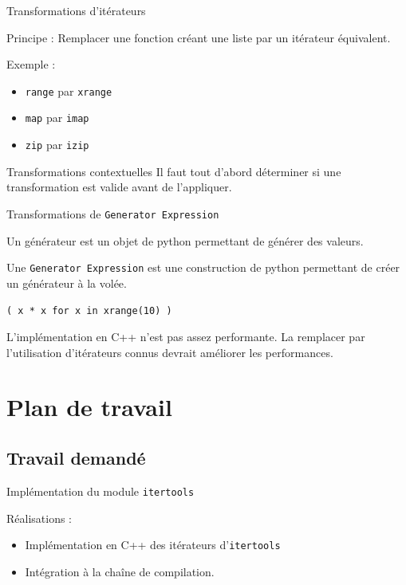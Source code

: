 \documentclass{beamer}
\begin{document}
\begin{frame}{Transformations d'itérateurs}

  Principe : Remplacer une fonction créant une liste par un itérateur
  équivalent.

  \pause Exemple :
  \begin{itemize}
  \item \texttt{range} par \texttt{xrange}
  \item \texttt{map} par \texttt{imap}
  \item \texttt{zip} par \texttt{izip}
  \end{itemize}

  \pause \begin{alertblock}{Transformations contextuelles} Il faut
    tout d'abord déterminer si une transformation est valide avant de
    l'appliquer.
  \end{alertblock}

\end{frame}

\begin{frame}{Transformations de \texttt{Generator Expression}}

  Un générateur est un objet de python permettant de générer des
  valeurs.

  Une \texttt{Generator Expression} est une construction de python
  permettant de créer un générateur à la volée.

  \pause\lstinline|( x * x for x in xrange(10) )|

  \pause L'implémentation en C++ n'est pas assez performante. La
  remplacer par l'utilisation d'itérateurs connus devrait améliorer
  les performances.

\end{frame}

\section{Plan de travail}

\subsection{Travail demandé}

\begin{frame}{Implémentation du module \texttt{itertools}}

  Réalisations :
  \begin{itemize}
    \item Implémentation en C++ des itérateurs
    d'\texttt{itertools} 
    \item Intégration à la chaîne de compilation.
  \end{itemize}

\end{frame}
\end{document}
